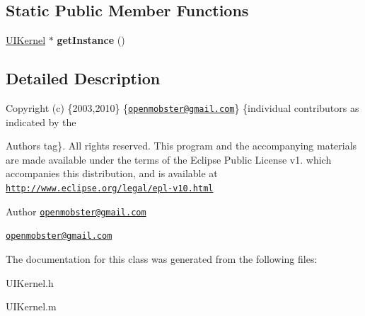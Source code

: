 \subsection*{\-Static \-Public \-Member \-Functions}
\begin{DoxyCompactItemize}
\item 
\hypertarget{interface_u_i_kernel_a63c3e1e67f93e27d2d7d81d6328a6f70}{
\hyperlink{interface_u_i_kernel}{\-U\-I\-Kernel} $\ast$ {\bfseries get\-Instance} ()}
\label{interface_u_i_kernel_a63c3e1e67f93e27d2d7d81d6328a6f70}

\end{DoxyCompactItemize}


\subsection{\-Detailed \-Description}
\-Copyright (c) \{2003,2010\} \{\href{mailto:openmobster@gmail.com}{\tt openmobster@gmail.\-com}\} \{individual contributors as indicated by the \begin{DoxyAuthor}{\-Authors}
tag\}. \-All rights reserved. \-This program and the accompanying materials are made available under the terms of the \-Eclipse \-Public \-License v1. which accompanies this distribution, and is available at \href{http://www.eclipse.org/legal/epl-v10.html}{\tt http\-://www.\-eclipse.\-org/legal/epl-\/v10.\-html}
\end{DoxyAuthor}
\begin{DoxyAuthor}{\-Author}
\href{mailto:openmobster@gmail.com}{\tt openmobster@gmail.\-com}

\href{mailto:openmobster@gmail.com}{\tt openmobster@gmail.\-com} 
\end{DoxyAuthor}


\-The documentation for this class was generated from the following files\-:\begin{DoxyCompactItemize}
\item 
\-U\-I\-Kernel.\-h\item 
\-U\-I\-Kernel.\-m\end{DoxyCompactItemize}
